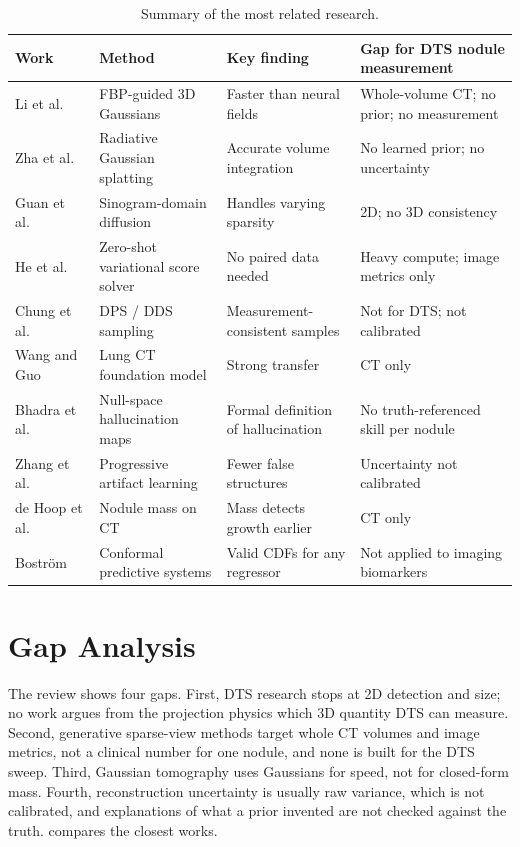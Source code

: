 \begin{table}[!htbp]
\centering\small
\caption{Summary of the most related research.}
\label{tab:related}
\begin{tabularx}{\linewidth}{>{\raggedright\arraybackslash}p{2.6cm} >{\raggedright\arraybackslash}p{2.6cm} >{\raggedright\arraybackslash}X >{\raggedright\arraybackslash}X}
\toprule
Work & Method & Key finding & Gap for DTS nodule measurement \\
\midrule
Li et al.~\cite{li2025gr} & FBP-guided 3D Gaussians & Faster than neural fields & Whole-volume CT; no prior; no measurement \\
Zha et al.~\cite{zha2024r2} & Radiative Gaussian splatting & Accurate volume integration & No learned prior; no uncertainty \\
Guan et al.~\cite{guan2024sino} & Sinogram-domain diffusion & Handles varying sparsity & 2D; no 3D consistency \\
He et al.~\cite{he2025vss} & Zero-shot variational score solver & No paired data needed & Heavy compute; image metrics only \\
Chung et al.~\cite{chung2023dps,chung2024dds} & DPS / DDS sampling & Measurement-consistent samples & Not for DTS; not calibrated \\
Wang and Guo~\cite{wang2025lctfound} & Lung CT foundation model & Strong transfer & CT only \\
Bhadra et al.~\cite{bhadra2021} & Null-space hallucination maps & Formal definition of hallucination & No truth-referenced skill per nodule \\
Zhang et al.~\cite{zhang2025pail} & Progressive artifact learning & Fewer false structures & Uncertainty not calibrated \\
de Hoop et al.~\cite{dehoop2010} & Nodule mass on CT & Mass detects growth earlier & CT only \\
Bostr\"om~\cite{bostrom2022crepes} & Conformal predictive systems & Valid CDFs for any regressor & Not applied to imaging biomarkers \\
\bottomrule
\end{tabularx}
\end{table}

\section{Gap Analysis}
\label{sec:gap}

The review shows four gaps. First, DTS research stops at 2D detection and size; no work argues from the projection physics which 3D quantity DTS can measure. Second, generative sparse-view methods target whole CT volumes and image metrics, not a clinical number for one nodule, and none is built for the DTS sweep. Third, Gaussian tomography uses Gaussians for speed, not for closed-form mass. Fourth, reconstruction uncertainty is usually raw variance, which is not calibrated, and explanations of what a prior invented are not checked against the truth.  compares the closest works.

